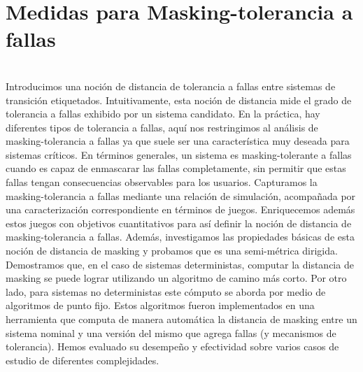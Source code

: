 \chapter{Medidas para Masking-tolerancia a fallas}
\label{cap:maskingMeasure}

 \\
Introducimos una noción de distancia de tolerancia a fallas entre sistemas de transición etiquetados. Intuitivamente, esta noción de distancia mide el grado de tolerancia a fallas exhibido por un sistema candidato.
En la práctica, hay diferentes tipos de tolerancia a fallas, aquí nos restringimos al análisis de masking-tolerancia a fallas ya que suele ser una característica muy deseada para sistemas críticos.
En términos generales, un sistema es masking-tolerante a fallas cuando es capaz de enmascarar las fallas completamente, sin permitir que estas fallas tengan consecuencias observables para los usuarios.
Capturamos la masking-tolerancia a fallas mediante una relación de simulación, acompañada por una caracterización correspondiente en términos de juegos.
Enriquecemos además estos juegos con objetivos cuantitativos para así definir la noción de distancia de masking-tolerancia a fallas.
Además, investigamos las propiedades básicas de esta noción de distancia de masking y probamos que es una semi-métrica dirigida.
Demostramos que, en el caso de sistemas deterministas, computar la distancia de masking se puede lograr utilizando un algoritmo de camino más corto.
Por otro lado, para sistemas no deterministas este cómputo se aborda por medio de algoritmos de punto fijo.
Estos algoritmos fueron implementados en una herramienta que computa de manera automática la distancia de masking entre un sistema nominal y una versión del mismo que agrega fallas (y mecanismos de tolerancia). Hemos evaluado su desempeño y efectividad sobre varios casos de estudio de diferentes complejidades.







%










